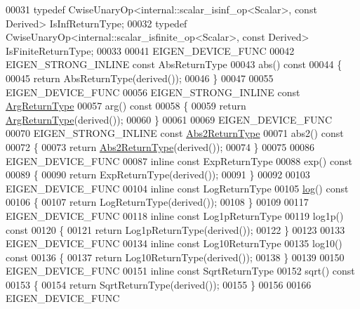 \begin{DoxyCode}
00031 \textcolor{keyword}{typedef} CwiseUnaryOp<internal::scalar\_isinf\_op<Scalar>, \textcolor{keyword}{const} Derived> IsInfReturnType;
00032 \textcolor{keyword}{typedef} CwiseUnaryOp<internal::scalar\_isfinite\_op<Scalar>, \textcolor{keyword}{const} Derived> IsFiniteReturnType;
00033 
00041 EIGEN\_DEVICE\_FUNC
00042 EIGEN\_STRONG\_INLINE \textcolor{keyword}{const} AbsReturnType
00043 abs()\textcolor{keyword}{ const}
00044 \textcolor{keyword}{}\{
00045   \textcolor{keywordflow}{return} AbsReturnType(derived());
00046 \}
00047 
00055 EIGEN\_DEVICE\_FUNC
00056 EIGEN\_STRONG\_INLINE \textcolor{keyword}{const} \hyperlink{group___core___module_class_eigen_1_1_cwise_unary_op}{ArgReturnType}
00057 arg()\textcolor{keyword}{ const}
00058 \textcolor{keyword}{}\{
00059   \textcolor{keywordflow}{return} \hyperlink{group___core___module_class_eigen_1_1_cwise_unary_op}{ArgReturnType}(derived());
00060 \}
00061 
00069 EIGEN\_DEVICE\_FUNC
00070 EIGEN\_STRONG\_INLINE \textcolor{keyword}{const} \hyperlink{group___core___module_class_eigen_1_1_cwise_unary_op}{Abs2ReturnType}
00071 abs2()\textcolor{keyword}{ const}
00072 \textcolor{keyword}{}\{
00073   \textcolor{keywordflow}{return} \hyperlink{group___core___module_class_eigen_1_1_cwise_unary_op}{Abs2ReturnType}(derived());
00074 \}
00075 
00086 EIGEN\_DEVICE\_FUNC
00087 \textcolor{keyword}{inline} \textcolor{keyword}{const} ExpReturnType
00088 exp()\textcolor{keyword}{ const}
00089 \textcolor{keyword}{}\{
00090   \textcolor{keywordflow}{return} ExpReturnType(derived());
00091 \}
00092 
00103 EIGEN\_DEVICE\_FUNC
00104 \textcolor{keyword}{inline} \textcolor{keyword}{const} LogReturnType
00105 \hyperlink{structlog}{log}()\textcolor{keyword}{ const}
00106 \textcolor{keyword}{}\{
00107   \textcolor{keywordflow}{return} LogReturnType(derived());
00108 \}
00109 
00117 EIGEN\_DEVICE\_FUNC
00118 \textcolor{keyword}{inline} \textcolor{keyword}{const} Log1pReturnType
00119 log1p()\textcolor{keyword}{ const}
00120 \textcolor{keyword}{}\{
00121   \textcolor{keywordflow}{return} Log1pReturnType(derived());
00122 \}
00123 
00133 EIGEN\_DEVICE\_FUNC
00134 \textcolor{keyword}{inline} \textcolor{keyword}{const} Log10ReturnType
00135 log10()\textcolor{keyword}{ const}
00136 \textcolor{keyword}{}\{
00137   \textcolor{keywordflow}{return} Log10ReturnType(derived());
00138 \}
00139 
00150 EIGEN\_DEVICE\_FUNC
00151 \textcolor{keyword}{inline} \textcolor{keyword}{const} SqrtReturnType
00152 sqrt()\textcolor{keyword}{ const}
00153 \textcolor{keyword}{}\{
00154   \textcolor{keywordflow}{return} SqrtReturnType(derived());
00155 \}
00156 
00166 EIGEN\_DEVICE\_FUNC

\end{DoxyCode}
